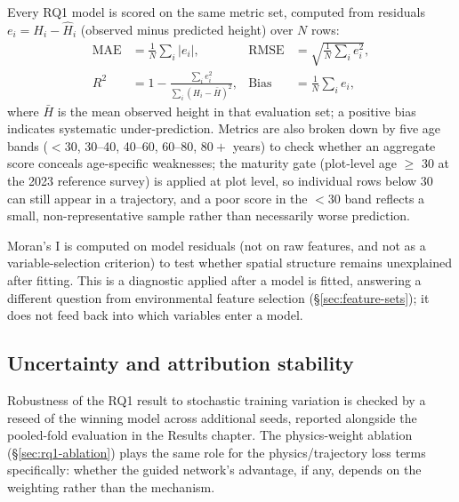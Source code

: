 Every RQ1 model is scored on the same metric set, computed from residuals $e_i = H_i - \hat H_i$
(observed minus predicted height) over $N$ rows:
\begin{align*}
\text{MAE} &= \frac{1}{N}\sum_i |e_i|, &
\text{RMSE} &= \sqrt{\frac{1}{N}\sum_i e_i^2}, \\
R^2 &= 1 - \frac{\sum_i e_i^2}{\sum_i (H_i - \bar H)^2}, &
\text{Bias} &= \frac{1}{N}\sum_i e_i,
\end{align*}
where $\bar H$ is the mean observed height in that evaluation set; a positive bias indicates
systematic under-prediction. Metrics are also broken down by five age bands ($<30$, 30--40,
40--60, 60--80, $80+$ years) to check whether an aggregate score conceals age-specific weaknesses;
the maturity gate (plot-level age $\geq$ 30 at the 2023 reference survey) is applied at plot
level, so individual rows below 30 can still appear in a trajectory, and a poor score in the
$<30$ band reflects a small, non-representative sample rather than necessarily worse prediction.

Moran's I is computed on model residuals (not on raw features, and not as a variable-selection
criterion) to test whether spatial structure remains unexplained after fitting. This is a
diagnostic applied after a model is fitted, answering a different question from environmental
feature selection (\S\ref{sec:feature-sets}); it does not feed back into which variables enter a
model.

\subsection{Uncertainty and attribution stability}
\label{sec:eval-uncertainty}

Robustness of the RQ1 result to stochastic training variation is checked by a reseed of the
winning model across additional seeds, reported alongside the pooled-fold evaluation in the
Results chapter. The physics-weight ablation (\S\ref{sec:rq1-ablation}) plays the same role for
the physics/trajectory loss terms specifically: whether the guided network's advantage, if any,
depends on the weighting rather than the mechanism.


